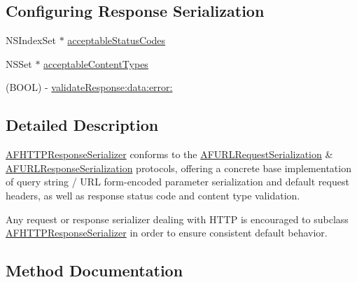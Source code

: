 \subsection*{Configuring Response Serialization}
\label{_amgrp94c412383321d03aa01a99b81009d01e}%


 

 \begin{DoxyCompactItemize}
\item 
N\+S\+Index\+Set $\ast$ \hyperlink{interface_a_f_h_t_t_p_response_serializer_a5d977b3a90fdc06ed91b875deacc0c5c}{acceptable\+Status\+Codes}
\item 
N\+S\+Set $\ast$ \hyperlink{interface_a_f_h_t_t_p_response_serializer_af89f899b8bcb560d179180084961940c}{acceptable\+Content\+Types}
\item 
(B\+O\+O\+L) -\/ \hyperlink{interface_a_f_h_t_t_p_response_serializer_a157d08e8e3bbb36627a82202c1482db1}{validate\+Response\+:data\+:error\+:}
\end{DoxyCompactItemize}


\subsection{Detailed Description}
{\ttfamily \hyperlink{interface_a_f_h_t_t_p_response_serializer}{A\+F\+H\+T\+T\+P\+Response\+Serializer}} conforms to the {\ttfamily \hyperlink{protocol_a_f_u_r_l_request_serialization-p}{A\+F\+U\+R\+L\+Request\+Serialization}} \& {\ttfamily \hyperlink{protocol_a_f_u_r_l_response_serialization-p}{A\+F\+U\+R\+L\+Response\+Serialization}} protocols, offering a concrete base implementation of query string / U\+R\+L form-\/encoded parameter serialization and default request headers, as well as response status code and content type validation.

Any request or response serializer dealing with H\+T\+T\+P is encouraged to subclass {\ttfamily \hyperlink{interface_a_f_h_t_t_p_response_serializer}{A\+F\+H\+T\+T\+P\+Response\+Serializer}} in order to ensure consistent default behavior. 

\subsection{Method Documentation}
\hypertarget{interface_a_f_h_t_t_p_response_serializer_a9aee0c560f22d56f985170b0cdc0617f}{}
